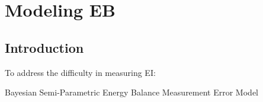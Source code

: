 \documentclass[handout]{beamer}\usepackage[]{graphicx}\usepackage[]{color}
\begin{document}
\section{Modeling EB}
\subsection{Introduction}
\begin{frame}
To address the difficulty in measuring EI:

\vspace{0.4cm}
\huge Bayesian Semi-Parametric Energy Balance Measurement Error Model

\end{frame}


% 
% 
% 
% 
\end{document}
